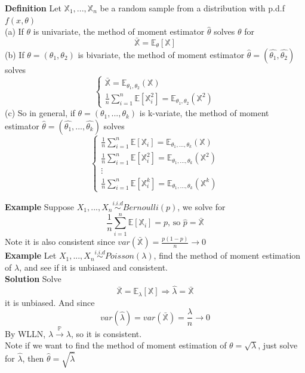 \documentclass[a4paper,12pt]{article}
\begin{document}
\textbf{Definition} Let $\mathbb{X}_1, ..., \mathbb{X}_n$ be a random sample from a distribution with p.d.f $f(x, \theta)$\\
(a) If $\theta$ is univariate, the method of moment estimator $\hat{\theta}$ solves $\theta$ for $$\bar{\mathbb{X}} = \mathbb{E}_\theta[\mathbb{X}]$$
(b) If $\theta = (\theta_1, \theta_2)$ is bivariate, the method of moment estimator $\hat{\theta} = (\hat{\theta_1}, \hat{\theta_2})$ solves
$$\begin{cases}
\bar{\mathbb{X}} = \mathbb{E}_{\theta_1, \theta_2}(\mathbb{X})\\
\frac{1}{n}\sum_{i=1}^n\mathbb{E}[ \mathbb{X}_i^2] = \mathbb{E}_{\theta_1, \theta_2}(\mathbb{X}^2)
\end{cases}
$$
(c) So in general, if $\theta = (\theta_1, ..., \theta_k)$ is k-variate, the method of moment estimator $\hat{\theta} = (\hat{\theta_1}, ..., \hat{\theta_k})$ solves
$$\begin{cases}
\frac{1}{n}\sum_{i=1}^n\mathbb{E}[ \mathbb{X}_i] = \mathbb{E}_{\theta_1, ...,  \theta_k}(\mathbb{X})\\
\frac{1}{n}\sum_{i=1}^n\mathbb{E}[ \mathbb{X}_i^2] = \mathbb{E}_{\theta_1, ..., \theta_k}(\mathbb{X}^2)\\
\vdots\\
\frac{1}{n}\sum_{i=1}^n\mathbb{E}[ \mathbb{X}_i^k] = \mathbb{E}_{\theta_1, ..., \theta_k}(\mathbb{X}^k)
\end{cases}$$

\textbf{Example} Suppose $X_1, ..., X_n \overset{i.i.d}{\sim} Bernoulli(p)$, we solve for
$$\frac{1}{n}\sum_{i=1}^n\mathbb{E}[ \mathbb{X}_i] = p \text{, so } \hat{p} = \bar{\mathbb{X}}$$
Note it is also consistent since $var(\bar{\mathbb{X}}) = \frac{p(1-p)}{n}\to 0$\\

\textbf{Example} Let $X_1, ..., X_n \overset{i.i.d}{\sim} Poisson(\lambda)$, find the method of moment estimation of $\lambda$, and see if it is unbiased and consistent.\\

\textbf{Solution} Solve
$$\bar{\mathbb{X}} = \mathbb{E}_\lambda[\mathbb{X}] \Rightarrow \hat{\lambda} = \bar{\mathbb{X}}$$
it is unbiased. And since
$$var(\hat{\lambda}) = var( \mathbb{\bar{X}} ) = \frac{\lambda}{n} \to 0$$ By WLLN, $\hat{\lambda} \overset{\mathbb{P}}{\to} \lambda$, so it is consistent.\\

Note if we want to find the method of moment estimation of $\theta = \sqrt{\lambda}$, just solve for $\hat{\lambda}$, then $\hat{\theta} = \sqrt{
\hat{\lambda}}$
\end{document}
